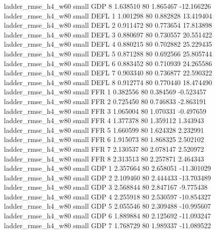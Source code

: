       ladder_rmse_h4_w60      small      GDP                 8 1.638510 80       1.865467         -12.166226
      ladder_rmse_h4_w80      small     DEFL                 1 1.001298 80       0.882828          13.419404
      ladder_rmse_h4_w80      small     DEFL                 2 0.911472 80       0.773654          17.813898
      ladder_rmse_h4_w80      small     DEFL                 3 0.880697 80       0.730557          20.551422
      ladder_rmse_h4_w80      small     DEFL                 4 0.880215 80       0.702882          25.229435
      ladder_rmse_h4_w80      small     DEFL                 5 0.871288 80       0.692566          25.805744
      ladder_rmse_h4_w80      small     DEFL                 6 0.883452 80       0.710939          24.265586
      ladder_rmse_h4_w80      small     DEFL                 7 0.903340 80       0.736877          22.590322
      ladder_rmse_h4_w80      small     DEFL                 8 0.912774 80       0.770440          18.474490
      ladder_rmse_h4_w80      small      FFR                 1 0.382556 80       0.384569          -0.523457
      ladder_rmse_h4_w80      small      FFR                 2 0.725450 80       0.746833          -2.863191
      ladder_rmse_h4_w80      small      FFR                 3 1.065004 80       1.070331          -0.497659
      ladder_rmse_h4_w80      small      FFR                 4 1.377378 80       1.359112           1.343943
      ladder_rmse_h4_w80      small      FFR                 5 1.660599 80       1.624328           2.232991
      ladder_rmse_h4_w80      small      FFR                 6 1.915073 80       1.868325           2.502102
      ladder_rmse_h4_w80      small      FFR                 7 2.130537 80       2.078147           2.520972
      ladder_rmse_h4_w80      small      FFR                 8 2.313513 80       2.257871           2.464343
      ladder_rmse_h4_w80      small      GDP                 1 2.357664 80       2.658051         -11.301029
      ladder_rmse_h4_w80      small      GDP                 2 2.109460 80       2.444433         -13.703489
      ladder_rmse_h4_w80      small      GDP                 3 2.568844 80       2.847167          -9.775438
      ladder_rmse_h4_w80      small      GDP                 4 2.255918 80       2.530597         -10.854327
      ladder_rmse_h4_w80      small      GDP                 5 2.055546 80       2.309488         -10.995607
      ladder_rmse_h4_w80      small      GDP                 6 1.889884 80       2.125692         -11.093247
      ladder_rmse_h4_w80      small      GDP                 7 1.768729 80       1.989337         -11.089522
